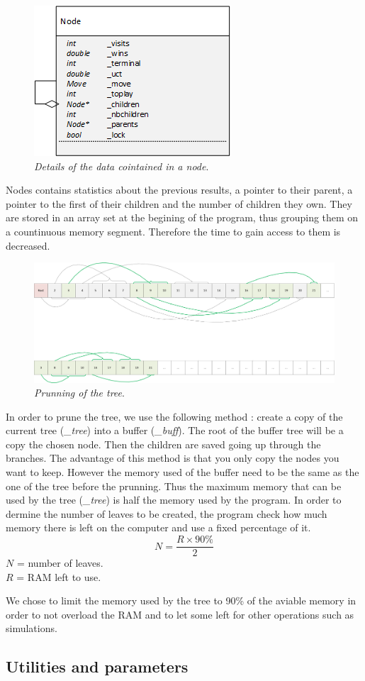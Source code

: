 \begin{figure}[H] 
\centerline{\includegraphics[scale=0.8]{Data_Structure/Img/Node.png}}
\caption{\label{fig:array}\textit{Details of the data cointained in a node}.}
\end{figure}
Nodes contains statistics about the previous results, a pointer to their parent, a pointer to the first of their children and the number of children they own. They are stored in an array set at the begining of the program, thus grouping them on a countinuous memory segment. Therefore the time to gain access to them is decreased.
\begin{figure}[H] 
\centerline{\includegraphics[width=\textwidth]{Data_Structure/Img/array.png}}
\caption{\label{fig:array}\textit{Prunning of the tree}.}
\end{figure}
In order to prune the tree, we use the following method : create a copy of the current tree (\textit{\_tree}) into a buffer (\textit{\_buff}). The root of the buffer tree will be a copy the chosen node. Then the children are saved going up through the branches. The advantage of this method is that you only copy the nodes you want to keep. However the memory used of the buffer need to be the same as the one of the tree before the prunning. Thus the maximum memory that can be used by the tree (\textit{\_tree}) is half the memory used by the program. In order to dermine the number of leaves to be created, the program check how much memory there is left on the computer and use a fixed percentage of it.
\begin{equation}
N = \frac{R \times 90\%}{2}
\end{equation}
\ensuremath{N} = number of leaves.\\
\ensuremath{R} = RAM left to use.

We chose to limit the memory used by the tree to 90\% of the aviable memory in order to not overload the RAM and to let some left for other operations such as simulations.
\subsection{Utilities and parameters}
